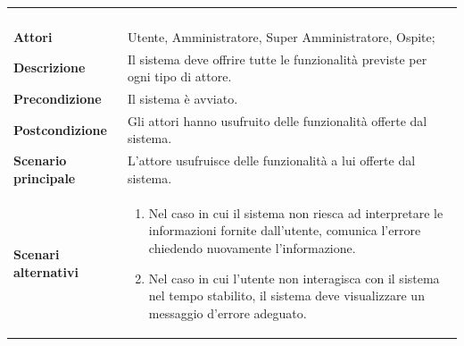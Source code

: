 \documentclass[AdR.tex]{subfiles}
\begin{document}
\begin{longtable}{l|p{10cm}}
\rowcolor[gray]{0.8} \multicolumn{2}{c}{} \\
\rowcolor[gray]{0.8} \multicolumn{2}{c}{\textbf{UCG - Scenario principale}} \\
\rowcolor[gray]{0.8} \multicolumn{2}{c}{} \\
\hline
&\\
\textbf{Attori} & Utente, Amministratore, Super Amministratore, Ospite;\\[7pt]
\textbf{Descrizione} & Il sistema deve offrire tutte le funzionalità previste per ogni tipo di attore.\\[7pt]
\textbf{Precondizione} & Il sistema è avviato.\\[7pt]
\textbf{Postcondizione} & Gli attori hanno usufruito delle funzionalità offerte dal sistema.\\[7pt]
\textbf{Scenario principale} & L'attore usufruisce delle funzionalità a lui offerte dal sistema.\\[7pt]
\textbf{Scenari alternativi} & 
\begin{enumerate}
 \item Nel caso in cui il sistema non riesca ad interpretare le informazioni fornite dall'utente, comunica l'errore chiedendo nuovamente l'informazione.
 \item Nel caso in cui l'utente non interagisca con il sistema nel tempo stabilito, il sistema deve visualizzare un messaggio d'errore adeguato.
\end{enumerate}\\[7pt]\hline
\end{longtable}

\newpage
\end{document}
